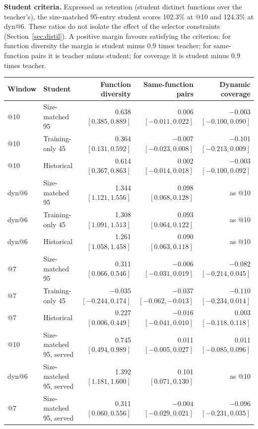 \textbf{Student criteria.} Expressed as retention (student distinct functions over the teacher's), the size-matched 95-entry student scores 102.3\% at @10 and 124.3\% at dyn@6. These ratios do not isolate the effect of the selector constraints (Section~\ref{sec:distil}). A positive margin favours satisfying the criterion: for function diversity the margin is student minus $0.9$ times teacher; for same-function pairs it is teacher minus student; for coverage it is student minus $0.9$ times teacher.
\begin{center}\footnotesize
\setlength{\tabcolsep}{4pt}
\begin{tabular}{llrrr}
\toprule
Window & Student & Function diversity & Same-function pairs & Dynamic coverage\\
\midrule
@10 & Size-matched 95 & 0.638 $[0.385,0.889]$ & 0.006 $[-0.011,0.022]$ & $-0.003$ $[-0.100,0.090]$\\
@10 & Training-only 45 & 0.364 $[0.131,0.592]$ & $-0.007$ $[-0.023,0.008]$ & $-0.101$ $[-0.213,0.009]$\\
@10 & Historical & 0.614 $[0.367,0.863]$ & 0.002 $[-0.014,0.018]$ & $-0.003$ $[-0.100,0.092]$\\
dyn@6 & Size-matched 95 & 1.344 $[1.121,1.556]$ & 0.098 $[0.068,0.128]$ & as @10\\
dyn@6 & Training-only 45 & 1.308 $[1.091,1.513]$ & 0.093 $[0.064,0.122]$ & as @10\\
dyn@6 & Historical & 1.261 $[1.058,1.458]$ & 0.090 $[0.063,0.118]$ & as @10\\
@7 & Size-matched 95 & 0.311 $[0.066,0.546]$ & $-0.006$ $[-0.031,0.019]$ & $-0.082$ $[-0.214,0.045]$\\
@7 & Training-only 45 & $-0.035$ $[-0.244,0.174]$ & $-0.037$ $[-0.062,-0.013]$ & $-0.110$ $[-0.234,0.014]$\\
@7 & Historical & 0.227 $[0.006,0.449]$ & $-0.016$ $[-0.041,0.010]$ & 0.003 $[-0.118,0.118]$\\
\midrule
@10 & Size-matched 95, served & 0.745 $[0.494,0.989]$ & 0.011 $[-0.005,0.027]$ & 0.011 $[-0.085,0.096]$\\
dyn@6 & Size-matched 95, served & 1.392 $[1.181,1.600]$ & 0.101 $[0.071,0.130]$ & as @10\\
@7 & Size-matched 95, served & 0.311 $[0.060,0.556]$ & $-0.004$ $[-0.029,0.021]$ & $-0.096$ $[-0.231,0.035]$\\
\bottomrule
\end{tabular}\end{center}
